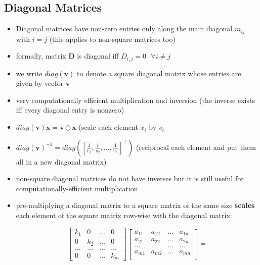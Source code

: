 \documentclass[11pt,twocolumn]{report}
\begin{document}
\subsection{Diagonal Matrices}
\begin{itemize}
  \item Diagonal matrices have non-zero entries only along the main
    diagonal $m_{ij}$ with $i = j$ (this applies to non-square matrices too)
  \item formally, matrix $\bm{D}$ is diagonal iff $D_{i, j} = 0 \text{  }
    \forall i \neq j$
  \item we write $diag(\bm{v})$ to denote a square diagonal matrix whose
    entries are given by vector $\bm{v}$
  \item very computationally efficient multiplication and inversion (the
    inverse exists iff every diagonal entry is nonzero)
  \item $diag(\bm{v})\bm{x} = \bm{v} \odot \bm{x}$ (scale each element $x_i$ by
    $v_i$
  \item $diag(\bm{v})^{-1} =
    diag([\frac{1}{v_1},\frac{1}{v_2},...,\frac{1}{v_n}]^\intercal)$
    (reciprocal each element and put them all in a new diagonal matrix)
  \item non-square diagonal matrices do not have inverses but it is still useful for
    computationally-efficient multiplication
  \item pre-multiplying a diagonal matrix to a square matrix of the same size
    \textbf{scales} each element of the square matrix row-wise with the
    diagonal matrix:
    \begin{scriptsize}
      \begin{equation*}
        \begin{bmatrix}
          k_1 & 0 & \hdots & 0\\
          0 & k_2 & \hdots & 0\\
          \hdots & \hdots & \hdots & \hdots\\
          0 & 0 & \hdots & k_m
        \end{bmatrix}
        \begin{bmatrix}
          a_{11} & a_{12} & \hdots & a_{1n}\\
          a_{21} & a_{22} & \hdots & a_{2n}\\
          \hdots & \hdots & \hdots & \hdots\\
          a_{m1} & a_{m2} & \hdots & a_{mn}\\
        \end{bmatrix}
        =

\end{equation*}
\end{scriptsize}
\end{itemize}
\end{document}
